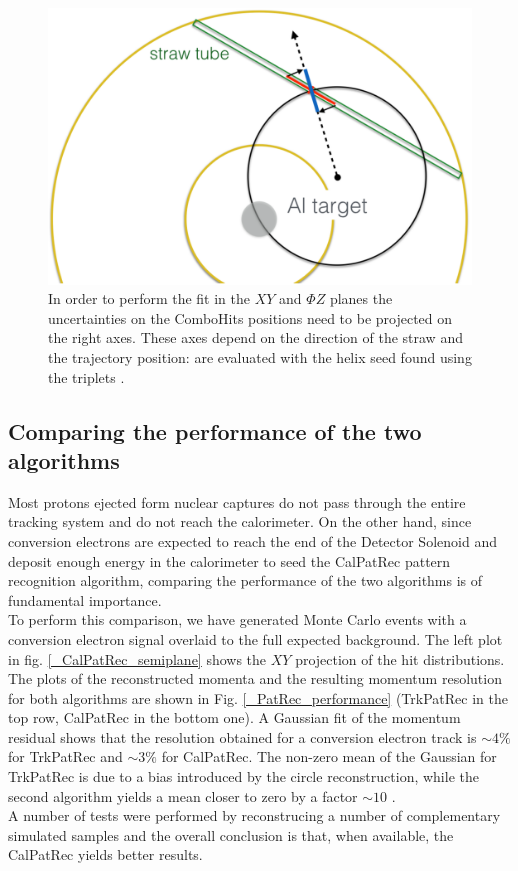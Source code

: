 \documentclass[12pt,a4paper,openright, oneside, titlepage]{book} %
\begin{document}
\begin{figure}[h!]
\centering
\includegraphics[scale=0.3]{giani_TrkPatRec_errors}
\caption[Projection of the uncertainties]{In order to perform the fit in the $XY$ and $\Phi Z$ planes the uncertainties on the ComboHits positions need to be projected on the right axes. 
These axes depend on the direction of the straw and the trajectory position: are evaluated with the helix seed found using the triplets \cite{GianiPatRec:2020}.}
\label{_TrkPatRec_errors}
\end{figure}

\subsection{Comparing the performance of the two algorithms}
Most protons ejected form nuclear captures do not pass through the entire tracking system and do not reach the calorimeter. 
On the other hand, since conversion electrons are expected to reach the end of the Detector Solenoid and deposit enough energy in the calorimeter to seed the CalPatRec pattern recognition algorithm, comparing the performance of the two algorithms is of fundamental importance.\\
To perform this comparison, we have generated Monte Carlo events with a conversion electron signal overlaid to the full expected background\cite{GianiPatRec:2020}.
The left plot in fig. \ref{_CalPatRec_semiplane} shows the $XY$ projection of the hit distributions.
The plots of the reconstructed momenta and the resulting momentum resolution for both algorithms are shown in Fig. \ref{_PatRec_performance} (TrkPatRec in the top row, CalPatRec in the bottom one). 
A Gaussian fit of the momentum residual shows that the resolution obtained for a conversion electron track is $\sim 4\%$ for TrkPatRec and $\sim 3\%$ for CalPatRec. 
The non-zero mean of the Gaussian for TrkPatRec is due to a bias introduced by the circle reconstruction, while the second algorithm yields a mean closer to zero by a factor $\sim 10$  \cite{GianiPatRec:2016} \cite{GianiPatRec:2020}. \\
A number of tests were performed by reconstrucing a number of complementary simulated samples and the overall conclusion is that, when available, the CalPatRec yields better results.
\end{document}
